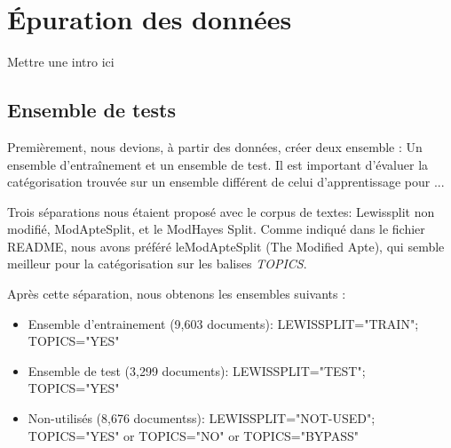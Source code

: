 \section{Épuration des données}
Mettre une intro ici
\subsection{Ensemble de tests}
Premièrement, nous devions, à partir des données, créer deux ensemble : Un ensemble d'entraînement et un ensemble de test. Il est important d'évaluer la catégorisation trouvée sur un ensemble différent de celui d'apprentissage pour ...

Trois séparations  nous étaient proposé avec le corpus de textes: Lewissplit non modifié, ModApteSplit, et le ModHayes Split.
Comme indiqué dans le fichier \textsc{README}, nous avons préféré leModApteSplit (The Modified Apte), qui semble meilleur pour la catégorisation sur les balises \textit{TOPICS}.

Après cette séparation, nous obtenons les ensembles suivants : 
\begin{itemize}
\item Ensemble d'entrainement (9,603 documents): LEWISSPLIT="TRAIN";  TOPICS="YES"
\item Ensemble de test (3,299 documents): LEWISSPLIT="TEST"; TOPICS="YES"
\item Non-utilisés (8,676 documentss):   LEWISSPLIT="NOT-USED"; TOPICS="YES" or TOPICS="NO"  or TOPICS="BYPASS"
\end{itemize}
